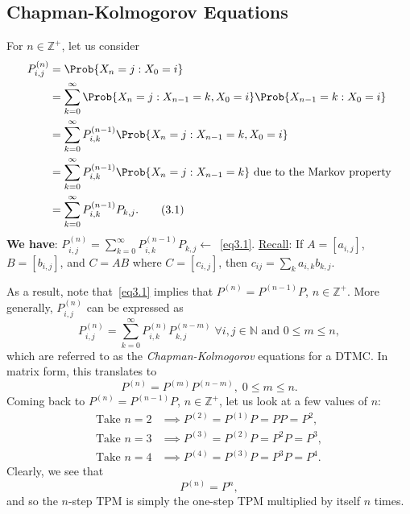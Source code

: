 \subsection*{Chapman-Kolmogorov Equations}
\begin{Regular}
    For $ n\in\mathbb{Z}^+ $, let us consider
    \begin{align*}
        P_{i, j}^{(n)} & =\Prob{X_{n}=j \given X_{0}=i}                                                                           \\
                       & =\sum_{k=0}^{\infty} \Prob{X_{n}=j \given X_{n-1}=k, X_{0}=i} \Prob{X_{n-1}=k \given X_{0}=i}            \\
                       & =\sum_{k=0}^{\infty} P_{i, k}^{(n-1)} \Prob{X_{n}=j \given X_{n-1}=k, X_{0}=i}                           \\
                       & =\sum_{k=0}^{\infty} P_{i, k}^{(n-1)} \Prob{X_{n}=j \given X_{n-1}=k} \text{ due to the Markov property} \\
                       & =\sum_{k=0}^{\infty} P_{i,k}^{(n-1)} P_{k, j}.\label{eq3.1}\tag*{(3.1)}
    \end{align*}
    \textbf{We have}: $ P_{i,j}^{(n)}=\sum_{k=0}^{\infty} P_{i,k}^{(n-1)}P_{k,j}\leftarrow $~\ref{eq3.1}.
    \tcblower{}
    \underline{Recall}: If $ A=[a_{i,j}] $, $ B=[b_{i,j}] $, and $ C=AB $ where $ C=[c_{i,j}] $, then $ c_{ij}=\sum_k a_{i,k}b_{k,j} $.

    As a result, note that~\ref{eq3.1} implies that $ P^{(n)}=P^{(n-1)}P $, $ n\in\mathbb{Z}^+ $. More generally, $ P_{i,j}^{(n)} $
    can be expressed as
    \[ P_{i,j}^{(n)}=\sum_{k=0}^{\infty} P_{i,k}^{(n)}P_{k,j}^{(n-m)}\; \forall i,j\in\mathbb{N}\text{ and }0\le m\le n, \]
    which are referred to as the \emph{Chapman-Kolmogorov} equations for a DTMC\@. In matrix form, this
    translates to
    \[ P^{(n)}=P^{(m)}P^{(n-m)},\; 0\le m\le n. \]
    Coming back to $ P^{(n)}=P^{(n-1)}P $, $ n\in\mathbb{Z}^+ $, let us look at a few values of $n$:
    \begin{align*}
        \text{Take }n=2 & \implies P^{(2)}=P^{(1)} P=P P=P^{2},     \\
        \text{Take }n=3 & \implies P^{(3)}=P^{(2)} P=P^{2} P=P^{3}, \\
        \text{Take }n=4 & \implies P^{(4)}=P^{(3)} P=P^{3} P=P^{4}.
    \end{align*}
    Clearly, we see that
    \[ P^{(n)}=P^n, \]
    and so the $ n $-step TPM is simply the one-step TPM multiplied by itself $ n $ times.
\end{Regular}

